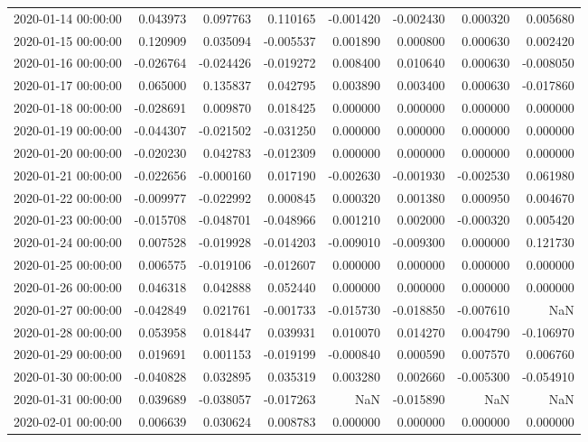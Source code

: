\begin{tabular}{lrrrrrrr}
2020-01-14 00:00:00 & 0.043973 & 0.097763 & 0.110165 & -0.001420 & -0.002430 & 0.000320 & 0.005680 \\
2020-01-15 00:00:00 & 0.120909 & 0.035094 & -0.005537 & 0.001890 & 0.000800 & 0.000630 & 0.002420 \\
2020-01-16 00:00:00 & -0.026764 & -0.024426 & -0.019272 & 0.008400 & 0.010640 & 0.000630 & -0.008050 \\
2020-01-17 00:00:00 & 0.065000 & 0.135837 & 0.042795 & 0.003890 & 0.003400 & 0.000630 & -0.017860 \\
2020-01-18 00:00:00 & -0.028691 & 0.009870 & 0.018425 & 0.000000 & 0.000000 & 0.000000 & 0.000000 \\
2020-01-19 00:00:00 & -0.044307 & -0.021502 & -0.031250 & 0.000000 & 0.000000 & 0.000000 & 0.000000 \\
2020-01-20 00:00:00 & -0.020230 & 0.042783 & -0.012309 & 0.000000 & 0.000000 & 0.000000 & 0.000000 \\
2020-01-21 00:00:00 & -0.022656 & -0.000160 & 0.017190 & -0.002630 & -0.001930 & -0.002530 & 0.061980 \\
2020-01-22 00:00:00 & -0.009977 & -0.022992 & 0.000845 & 0.000320 & 0.001380 & 0.000950 & 0.004670 \\
2020-01-23 00:00:00 & -0.015708 & -0.048701 & -0.048966 & 0.001210 & 0.002000 & -0.000320 & 0.005420 \\
2020-01-24 00:00:00 & 0.007528 & -0.019928 & -0.014203 & -0.009010 & -0.009300 & 0.000000 & 0.121730 \\
2020-01-25 00:00:00 & 0.006575 & -0.019106 & -0.012607 & 0.000000 & 0.000000 & 0.000000 & 0.000000 \\
2020-01-26 00:00:00 & 0.046318 & 0.042888 & 0.052440 & 0.000000 & 0.000000 & 0.000000 & 0.000000 \\
2020-01-27 00:00:00 & -0.042849 & 0.021761 & -0.001733 & -0.015730 & -0.018850 & -0.007610 & NaN \\
2020-01-28 00:00:00 & 0.053958 & 0.018447 & 0.039931 & 0.010070 & 0.014270 & 0.004790 & -0.106970 \\
2020-01-29 00:00:00 & 0.019691 & 0.001153 & -0.019199 & -0.000840 & 0.000590 & 0.007570 & 0.006760 \\
2020-01-30 00:00:00 & -0.040828 & 0.032895 & 0.035319 & 0.003280 & 0.002660 & -0.005300 & -0.054910 \\
2020-01-31 00:00:00 & 0.039689 & -0.038057 & -0.017263 & NaN & -0.015890 & NaN & NaN \\
2020-02-01 00:00:00 & 0.006639 & 0.030624 & 0.008783 & 0.000000 & 0.000000 & 0.000000 & 0.000000 \\

\end{tabular}
